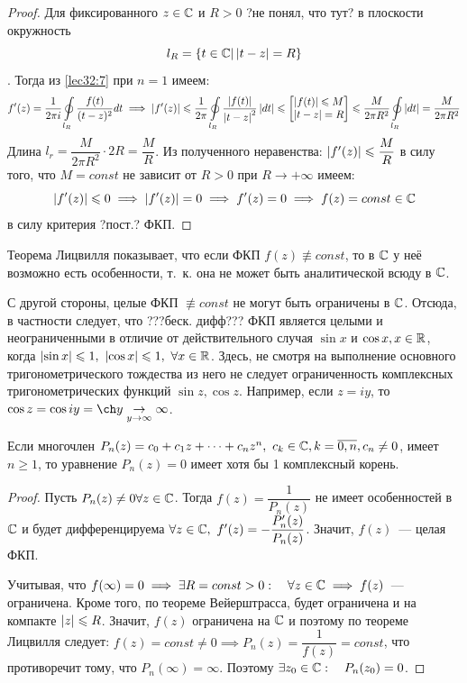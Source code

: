 \documentclass[../../main.tex]{subfiles}
\begin{document}
	
\begin{proof}
	Для фиксированного $ z \in \mathbb{C} $ и $ R > 0 $ ?не понял, что тут? 
	в плоскости  окружность 
	\[ l_R = \{ t \in \mathbb{C} | \left|{t - z}\right| = R\} \]. 
	Тогда из \eqref{lec32:7} при $ n = 1 $ имеем:
	\[
	f'(z) = \dfrac{1}{2\pi i} \oint\limits_{l_R} 
	\dfrac{f(t)}{(t - z)^2} dt \implies
	\left|{f'(z)}\right| \leqslant \dfrac{1}{2\pi}
	\oint\limits_{l_R} \dfrac{\left|{f(t)}\right|}{\left|{t - z}\right|^2}
	\left|{dt}\right| \leqslant
	\begin{bmatrix}
		\left|{f(t)}\right| \leqslant M \\
		\left|{t - z}\right| = R
	\end{bmatrix} \leqslant \dfrac{M}{2\pi R^2}
	\oint\limits_{l_R} \left|{dt}\right| =
	\dfrac{M}{2\pi R^2}
	\]
	Длина $ l_r = \dfrac{M}{2\pi R^2} \cdot 2R = \dfrac{M}{R} $.
	Из полученного неравенства: $ \left|{f'(z)}\right| \leqslant 
	\dfrac{M}{R} $ в силу того, что $ M = const $ не 
	зависит от $ R > 0 $ при $ R \to +\infty $ имеем:
	\[
	\left|{f'(z)}\right| \leqslant 0 \implies 
	\left|{f'(z)}\right| = 0 \implies 
	f'(z) = 0 \implies 
	f(z) = const \in \mathbb{C}
	\] в силу критерия ?пост.? ФКП.
\end{proof}
\begin{rem}
	Теорема Лицвилля показывает, что если ФКП $ f(z) \not\equiv const $,
	то в $ \mathbb{C} $ у неё возможно есть особенности, т.~к.
	она не может быть аналитической всюду в $ \mathbb{C} $.
\end{rem}
С другой стороны, целые ФКП $ \not\equiv const $ не могут быть ограничены в $ \mathbb{C} $.
Отсюда, в частности следует, что ???беск. дифф??? ФКП
является целыми и неограниченными в отличие от действительного 
случая $ \sin x $ и $ \cos x, x \in \mathbb{R} $, когда $ \abs{\sin x} \leq 1,\ 
\abs{\cos x} \leq 1,\ \forall x \in \R $. 
Здесь, не смотря на выполнение основного тригонометрического тождества 
из него не следует ограниченность комплексных тригонометрических функций $ 
\sin z,\cos z $. Например, если $ z = iy $, то
$ \cos z = \cos iy = \ch y
\underset{y \to \infty}{\to} \infty$.

\begin{crl}
	Если многочлен $ P_n(z) = c_0 + c_1z + \dots + c_nz^n,\ c_k \in \mathbb{C},
	k = \overline{0, n}, c_n \neq 0 $, имеет $ n \geq 1 $, то уравнение $ P_n(z) = 0 $ имеет хотя бы 1 комплексный корень.
\end{crl}
\begin{proof}
	Пусть $ P_n(z) \neq 0 \forall z \in \mathbb{C} $.
	Тогда $ f(z) = \dfrac{1}{P_n(z)} $ не имеет особенностей в $ \mathbb{C} $ 
	и будет дифференцируема $ \forall z \in \mathbb{C},\
	f'(z) = -\dfrac{P_n'(z)}{P_n(z)} $. Значит, 
	$ f(z) $~--- целая ФКП.
	
	Учитывая, что $ f(\infty) = 0 \implies
	\exists R = const > 0:\quad \forall z \in \mathbb{C} \implies
	f(z) $~--- ограничена. Кроме того, по теореме Вейерштрасса, будет 
	ограничена и на компакте $ \left|{z}\right| \leqslant R $.
	Значит, $ f(z) $ ограничена на $ \mathbb{C} $ и поэтому по теореме Лицвилля следует:
	$ f(z) = const \neq 0 \implies P_n(z) = \dfrac{1}{f(z)} = const $, 
	что противоречит тому, что $ P_n(\infty)  = \infty $. Поэтому $ 
	\exists z_0 \in \mathbb{C}:\quad P_n(z_0) = 0 $.
\end{proof}
\end{document}

